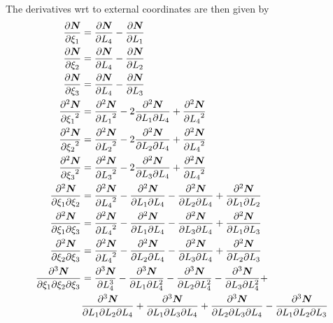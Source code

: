 The derivatives wrt to external coordinates are then given by
\begin{align}
  \delby{\vect{\sbfnsymb{}}}{\xi_{1}} &= \delby{\vect{\sbfnsymb{}}}{L_{4}}-\delby{\vect{\sbfnsymb{}}}{L_{1}} \\
  \delby{\vect{\sbfnsymb{}}}{\xi_{2}} &= \delby{\vect{\sbfnsymb{}}}{L_{4}}-\delby{\vect{\sbfnsymb{}}}{L_{2}} \\
  \delby{\vect{\sbfnsymb{}}}{\xi_{3}} &= \delby{\vect{\sbfnsymb{}}}{L_{4}}-\delby{\vect{\sbfnsymb{}}}{L_{3}} \\
  \deltwosqby{\vect{\sbfnsymb{}}}{\xi_{1}} &= \deltwosqby{\vect{\sbfnsymb{}}}{L_{1}}-
  2\deltwoby{\vect{\sbfnsymb{}}}{L_{1}}{L_{4}}+\deltwosqby{\vect{\sbfnsymb{}}}{L_{4}} \\
  \deltwosqby{\vect{\sbfnsymb{}}}{\xi_{2}} &= \deltwosqby{\vect{\sbfnsymb{}}}{L_{2}}-
  2\deltwoby{\vect{\sbfnsymb{}}}{L_{2}}{L_{4}}+\deltwosqby{\vect{\sbfnsymb{}}}{L_{4}} \\
  \deltwosqby{\vect{\sbfnsymb{}}}{\xi_{3}} &= \deltwosqby{\vect{\sbfnsymb{}}}{L_{3}}-
  2\deltwoby{\vect{\sbfnsymb{}}}{L_{3}}{L_{4}}+\deltwosqby{\vect{\sbfnsymb{}}}{L_{4}} \\  
  \deltwoby{\vect{\sbfnsymb{}}}{\xi_{1}}{\xi_{2}} &= \deltwosqby{\vect{\sbfnsymb{}}}{L_{4}}-
  \deltwoby{\vect{\sbfnsymb{}}}{L_{1}}{L_{4}}-\deltwoby{\vect{\sbfnsymb{}}}{L_{2}}{L_{4}}+
  \deltwoby{\vect{\sbfnsymb{}}}{L_{1}}{L_{2}} \\
  \deltwoby{\vect{\sbfnsymb{}}}{\xi_{1}}{\xi_{3}} &= \deltwosqby{\vect{\sbfnsymb{}}}{L_{4}}-
  \deltwoby{\vect{\sbfnsymb{}}}{L_{1}}{L_{4}}-\deltwoby{\vect{\sbfnsymb{}}}{L_{3}}{L_{4}}+
  \deltwoby{\vect{\sbfnsymb{}}}{L_{1}}{L_{3}} \\
  \deltwoby{\vect{\sbfnsymb{}}}{\xi_{2}}{\xi_{3}} &= \deltwosqby{\vect{\sbfnsymb{}}}{L_{4}}-
  \deltwoby{\vect{\sbfnsymb{}}}{L_{2}}{L_{4}}-\deltwoby{\vect{\sbfnsymb{}}}{L_{3}}{L_{4}}+
  \deltwoby{\vect{\sbfnsymb{}}}{L_{2}}{L_{3}} \\
  \delthreeby{\vect{\sbfnsymb{}}}{\xi_{1}}{\xi_{2}}{\xi_{3}} &= \delthreecuby{\vect{\sbfnsymb{}}}{L_{4}}-
  \deldeltwoby{\vect{\sbfnsymb{}}}{L_{1}}{L_{4}}-\deldeltwoby{\vect{\sbfnsymb{}}}{L_{2}}{L_{4}}-
  \deldeltwoby{\vect{\sbfnsymb{}}}{L_{3}}{L_{4}}+ \\
  &\delthreeby{\vect{\sbfnsymb{}}}{L_{1}}{L_{2}}{L_{4}}+\delthreeby{\vect{\sbfnsymb{}}}{L_{1}}{L_{3}}{L_{4}}+
  \delthreeby{\vect{\sbfnsymb{}}}{L_{2}}{L_{3}}{L_{4}}-\delthreeby{\vect{\sbfnsymb{}}}{L_{1}}{L_{2}}{L_{3}}
\end{align}

